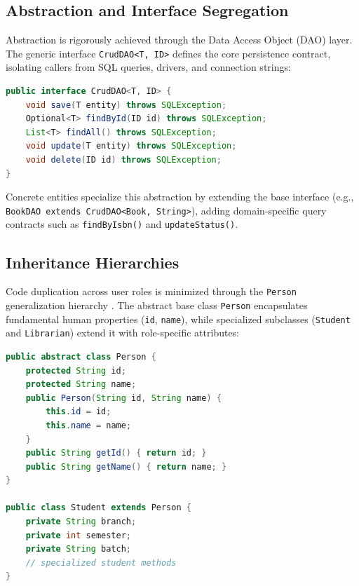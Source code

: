 \subsection{Abstraction and Interface Segregation}
Abstraction is rigorously achieved through the Data Access Object (DAO) layer. The generic interface \texttt{CrudDAO<T, ID>} defines the core persistence contract, isolating callers from SQL queries, drivers, and connection strings:
\begin{lstlisting}[language=Java, caption={Generic CRUD Abstraction}]
public interface CrudDAO<T, ID> {
    void save(T entity) throws SQLException;
    Optional<T> findById(ID id) throws SQLException;
    List<T> findAll() throws SQLException;
    void update(T entity) throws SQLException;
    void delete(ID id) throws SQLException;
}
\end{lstlisting}
Concrete entities specialize this abstraction by extending the base interface (e.g., \texttt{BookDAO extends CrudDAO<Book, String>}), adding domain-specific query contracts such as \texttt{findByIsbn()} and \texttt{updateStatus()}.

\subsection{Inheritance Hierarchies}
Code duplication across user roles is minimized through the \texttt{Person} generalization hierarchy \cite{bloch2018effective}. The abstract base class \texttt{Person} encapsulates fundamental human properties (\texttt{id}, \texttt{name}), while specialized subclasses (\texttt{Student} and \texttt{Librarian}) extend it with role-specific attributes:
\begin{lstlisting}[language=Java, caption={Inheritance Hierarchy}]
public abstract class Person {
    protected String id;
    protected String name;
    public Person(String id, String name) {
        this.id = id;
        this.name = name;
    }
    public String getId() { return id; }
    public String getName() { return name; }
}

public class Student extends Person {
    private String branch;
    private int semester;
    private String batch;
    // specialized student methods
}
\end{lstlisting}

